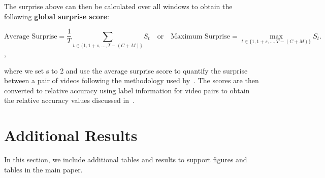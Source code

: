 \documentclass{applemlr}
\numberwithin{equation}{section}
\begin{document}
The surprise above can then be calculated over all windows to obtain  the following \textbf{global surprise score}:

\begin{equation}
\text{Average Surprise} = \frac{1}{T} \sum_{t \in \{1,1+s,\ldots,T-(C+M)\}} S_t \quad \text{or} \quad \text{Maximum Surprise} = \max_{t \in \{1,1+s,\ldots,T-(C+M)\}} S_t.
\end{equation},

where we set s to 2 and use the average surprise score to quantify the surprise between a pair of videos following the methodology used by~\citet{garrido2025intuitive}. The scores are then converted to relative accuracy using label information for video pairs to obtain the relative accuracy values discussed in~.

\section{Additional Results}
\label{appendix:sec:additional_results}

In this section, we include additional tables and results to support figures and tables in the main paper.
\end{document}
